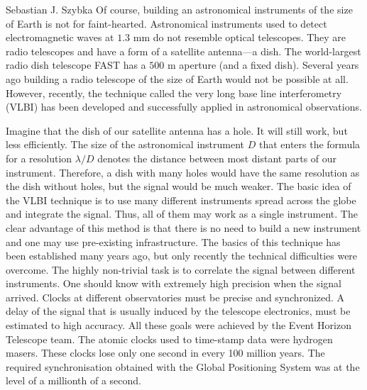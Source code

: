 \begin{artengenv}{Sebastian J. Szybka}
Of course, building an astronomical instruments of the size of Earth is not for faint-hearted. Astronomical instruments used to detect electromagnetic waves at $1.3$ mm do not resemble optical telescopes. They are radio telescopes and have a form of a satellite antenna---a dish. The world-largest radio dish telescope FAST has a $500$ m aperture (and a fixed dish). Several years ago building a radio telescope of the size of Earth would not be possible at all. However, recently, the technique called the very long base line interferometry (VLBI) has been developed and successfully applied in astronomical observations. 

Imagine that the dish of our satellite antenna has a hole. It will still work, but less efficiently. The size of the astronomical instrument $D$ that enters the formula for a resolution $\lambda/D$ denotes the distance between most distant parts of our instrument. Therefore, a dish with many holes would have the same resolution as the dish without holes, but the signal would be much weaker. The basic idea of the VLBI technique is to use many different instruments spread across the globe and integrate the signal. Thus, all of them may work as a single instrument. The clear advantage of this method is that there is no need to build a new instrument and one may use pre-existing infrastructure. The basics of this technique has been established many years ago, but only recently the technical difficulties were overcome. The highly non-trivial task is to correlate the signal between different instruments. One should know with extremely high precision when the signal arrived. Clocks at different observatories must be precise and synchronized. A delay of the signal that is usually induced by the telescope electronics, must be estimated to high accuracy. All these goals were achieved by the Event Horizon Telescope team. The atomic clocks used to time-stamp data were hydrogen masers. These clocks lose only one second in every 100 million years. The required synchronisation obtained with the Global Positioning System was at the level of a millionth of a second.


\end{artengenv}
